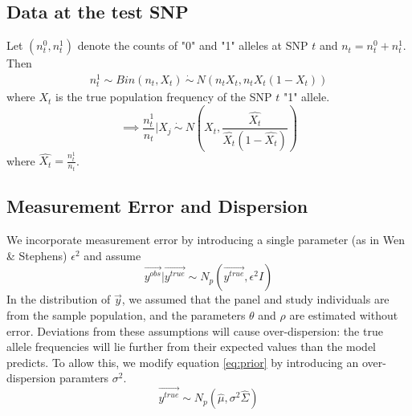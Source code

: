 \documentclass[10pt,a4paper,draft]{article}
\begin{document}
\iffalse
The distribution of $\{y_j: j \neq t\}$ given the test SNP,
\begin{equation}
\{y_i: i \neq t\} | y_t \sim N_{p-1}(\bar{\mu}, \bar{\Sigma}) \label{cond}
\end{equation}
where
\begin{align*}
\bar{\mu} = \vec{\mu_{i \neq t}} + \Sigma_{i \neq t, t}\frac{1}{\sigma_t^2}(y_t-\mu_{t}) 
\end{align*}
and
\begin{align*}
\hat{\Sigma} = \Sigma_{i \neq t, i \neq t} - \Sigma_{i \neq t, t}\frac{1}{\sigma_t^2}\Sigma_{t, i \neq t}
\end{align*}
\fi

\subsection{Data at the test SNP}
Let $(n_t^0, n_t^1)$ denote the counts of "0" and "1" alleles at SNP $t$ and $n_t = n_t^0 + n_t^1$. Then 
\begin{align*}
n_t^1 \sim Bin(n_t, X_t) \ \dot{\sim}  \ N(n_tX_t, n_tX_t(1-X_t)) \label{eq:napprox}
\end{align*}
where $X_t$ is the true population frequency of the SNP $t$ "1" allele. 
\begin{equation}
\implies \frac{n_t^1}{n_t} | X_j \ \dot{\sim} \ N(X_t, \frac{\hat{X_t}}{\hat{X_t}(1-\hat{X_t})}) \label{prior}
\end{equation}
where $\hat{X_t} = \frac{n_t^1}{n_t}$.


\subsection{Measurement Error and Dispersion}

We incorporate measurement error by introducing a single parameter (as in Wen \& Stephens) $\epsilon^2$ and assume
\begin{equation}
\vec{y^{obs}} | \vec{y^{true}} \sim N_p(\vec{y^{true}}, \epsilon^2I)
\end{equation}
In the distribution of $\vec{y}$, we assumed that the panel and study individuals are from the sample population, and the parameters $\theta$ and $\rho$ are estimated without error. Deviations from these assumptions will cause over-dispersion: the true allele frequencies will lie further from their expected values than the model predicts. To allow this, we modify equation \ref{eq:prior} by introducing an over-dispersion paramters $\sigma^2$.
\begin{equation}
\vec{y^{true}} \sim N_p(\hat{\mu}, \sigma^2\hat{\Sigma})
\end{equation}
\end{document}
